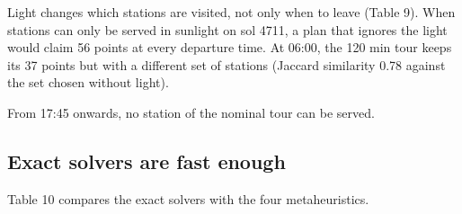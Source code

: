 \documentclass[11pt,a4paper]{article}
\begin{document}
Light changes which stations are visited, not only when to leave (Table 9). When stations can only be served in sunlight on sol 4711, a plan that ignores the light would claim 56 points at every departure time. At 06:00, the 120 min tour keeps its 37 points but with a different set of stations (Jaccard similarity 0.78 against the set chosen without light).

\begin{table}[H]
\centering\small
\caption{\textbf{Table 9. Points of the station tours against the departure time when stations need light} (local true solar time, waiting at 0 W).}
\end{table}

From 17:45 onwards, no station of the nominal tour can be served.

\subsection{Exact solvers are fast enough}

Table 10 compares the exact solvers with the four metaheuristics.

\begin{table}[H]
\centering\small
\caption{\textbf{Table 10. Exact solvers against four metaheuristics.} Share of instances solved to optimality, mean gap and median time.}
\end{table}
\end{document}
